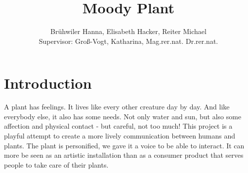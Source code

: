 \documentclass[12pt, a4paper]{article}
\begin{document}
\title{Moody Plant}
\author{Br\"uhwiler Hanna, Elisabeth Hacker, Reiter Michael \\\small{Supervisor: Gro\ss-Vogt, Katharina, Mag.rer.nat. Dr.rer.nat.}}




\maketitle
\newpage
\pagestyle{empty}

\hspace{1cm}\vspace{1cm}


\newpage
\pagestyle{myheadings}
\hspace{1cm}\vspace{2cm}


\tableofcontents
\newpage

\nocite{prosody}
\nocite{couch}
\nocite{plantGrowing}
\nocite{positiveInteraction}
\nocite{github}


\section{Introduction}
A plant has feelings. It lives like every other creature day by day. And like everybody else, it also has some needs. Not only water and sun, but also some affection and physical contact - but careful, not too much! 
This project is a playful attempt to create a more lively communication between humans and plants. The plant is personified, we gave it a voice to be able to interact. It can more be seen as an artistic installation than as a consumer product that serves people to take care of their plants.






















\newpage


\end{document}
